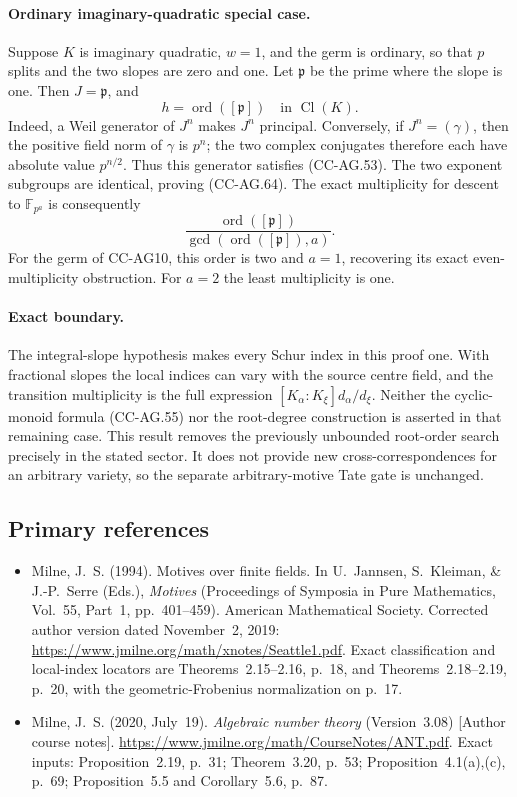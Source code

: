 \paragraph{Ordinary imaginary-quadratic special case.}
Suppose \(K\) is imaginary quadratic, \(w=1\), and the
germ is ordinary, so that \(p\) splits and the two
slopes are zero and one.  Let \(\mathfrak p\) be the
prime where the slope is one.
Then \(J=\mathfrak p\), and
\[
                           h=\operatorname{ord}([\mathfrak p])
                                  \quad\text{in }\operatorname{Cl}(K).
                                                               \tag{CC-AG.64}
\]
Indeed, a Weil generator of \(J^n\) makes \(J^n\)
principal.  Conversely, if
\(J^n=(\gamma)\), then
the positive field norm of \(\gamma\) is \(p^n\);
the two complex conjugates therefore each have
absolute value \(p^{n/2}\).  Thus this generator
satisfies (CC-AG.53).  The two exponent subgroups
are identical, proving (CC-AG.64).
The exact multiplicity for descent to \(\mathbb F_{p^a}\)
is consequently
\[
             \frac{\operatorname{ord}([\mathfrak p])}
                  {\gcd(\operatorname{ord}([\mathfrak p]),a)}.
\]
For the germ of CC-AG10, this order is two and
\(a=1\), recovering its exact even-multiplicity
obstruction.  For \(a=2\) the least multiplicity
is one.

\paragraph{Exact boundary.}
The integral-slope hypothesis makes every Schur index
in this proof one.  With fractional slopes the local
indices can vary with the source centre field, and
the transition multiplicity is the full expression
\([K_\alpha:K_\xi]d_\alpha/d_\xi\).
Neither the cyclic-monoid formula (CC-AG.55) nor the
root-degree construction is asserted in that remaining
case.  This result removes the previously unbounded
root-order search precisely in the stated sector.
It does not provide new cross-correspondences for an
arbitrary variety, so the separate arbitrary-motive
Tate gate is unchanged.

\subsection{Primary references}

\begin{itemize}
\item Milne, J.~S. (1994). Motives over finite fields. In
U.~Jannsen, S.~Kleiman, \& J.-P.~Serre (Eds.),
\emph{Motives} (Proceedings of Symposia in Pure Mathematics,
Vol.~55, Part~1, pp.~401--459). American Mathematical
Society. Corrected author version dated November~2, 2019:
\url{https://www.jmilne.org/math/xnotes/Seattle1.pdf}.
Exact classification and local-index locators are
Theorems~2.15--2.16, p.~18, and Theorems~2.18--2.19,
p.~20, with the geometric-Frobenius normalization
on p.~17.
\item Milne, J.~S. (2020, July~19).
\emph{Algebraic number theory} (Version~3.08)
[Author course notes].
\url{https://www.jmilne.org/math/CourseNotes/ANT.pdf}.
Exact inputs: Proposition~2.19, p.~31;
Theorem~3.20, p.~53; Proposition~4.1(a),(c),
p.~69; Proposition~5.5 and Corollary~5.6, p.~87.
\end{itemize}
